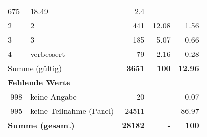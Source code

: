 \begin{longtable}{lXrrr}
       \num{675} &
       \num[round-mode=places,round-precision=2]{18,49} &
         \num[round-mode=places,round-precision=2]{2,4} \\

     2 &
     \multicolumn{1}{X}{ 2   } &


       \num{441} &
       \num[round-mode=places,round-precision=2]{12,08} &
         \num[round-mode=places,round-precision=2]{1,56} \\

     3 &
     \multicolumn{1}{X}{ 3   } &


       \num{185} &
       \num[round-mode=places,round-precision=2]{5,07} &
         \num[round-mode=places,round-precision=2]{0,66} \\

     4 &
     \multicolumn{1}{X}{ verbessert   } &


       \num{79} &
       \num[round-mode=places,round-precision=2]{2,16} &
         \num[round-mode=places,round-precision=2]{0,28} \\
     \midrule
     \multicolumn{2}{l}{Summe (gültig)} &
       \textbf{\num{3651}} &
     \textbf{100} &
       \textbf{\num[round-mode=places,round-precision=2]{12,96}} \\
     \multicolumn{5}{l}{\textbf{Fehlende Werte}}\\
       -998 &
       keine Angabe &
         \num{20} &
        - &
         \num[round-mode=places,round-precision=2]{0,07} \\
       -995 &
       keine Teilnahme (Panel) &
         \num{24511} &
        - &
         \num[round-mode=places,round-precision=2]{86,97} \\
     \midrule
     \multicolumn{2}{l}{\textbf{Summe (gesamt)}} &
          \textbf{\num{28182}} &
        \textbf{-} &
        \textbf{100} \\
     \bottomrule
     \end{longtable}
     
